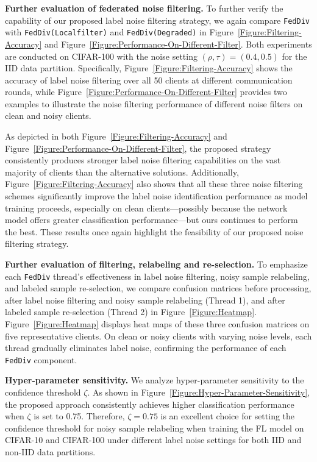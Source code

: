 \documentclass[letterpaper]{article} %
\begin{document}
\noindent
\textbf{Further evaluation of federated noise filtering.} To further verify the capability of our proposed label noise filtering strategy, we again compare \texttt{FedDiv} with \texttt{FedDiv(Local\;filter)} and \texttt{FedDiv(Degraded)} in Figure~\textcolor{red}{\ref{Figure:Filtering-Accuracy}} and Figure~\textcolor{red}{\ref{Figure:Performance-On-Different-Filter}}. Both experiments are conducted on CIFAR-100 with the noise setting $(\rho, \tau)=(0.4, 0.5)$ for the IID data partition. Specifically, Figure~\textcolor{red}{\ref{Figure:Filtering-Accuracy}} shows the accuracy of label noise filtering over all 50 clients at different communication rounds, while Figure~\textcolor{red}{\ref{Figure:Performance-On-Different-Filter}} provides two examples to illustrate the noise filtering performance of different noise filters on clean and noisy clients.

As depicted in both Figure~\textcolor{red}{\ref{Figure:Filtering-Accuracy}} and Figure~\textcolor{red}{\ref{Figure:Performance-On-Different-Filter}}, the proposed strategy consistently produces stronger label noise filtering capabilities on the vast majority of clients than the alternative solutions. Additionally, Figure~\textcolor{red}{\ref{Figure:Filtering-Accuracy}} also shows that all these three noise filtering schemes significantly improve the label noise identification performance as model training proceeds, especially on clean clients—possibly because the network model offers greater classification performance—but ours continues to perform the best.
These results once again highlight the feasibility of our proposed noise filtering strategy.

\noindent
\textbf{Further evaluation of filtering, relabeling and re-selection.} To emphasize each \texttt{FedDiv} thread's effectiveness in label noise filtering, noisy sample relabeling, and labeled sample re-selection, we compare confusion matrices before processing, after label noise filtering and noisy sample relabeling (Thread 1), and after labeled sample re-selection (Thread 2) in Figure~\textcolor{red}{\ref{Figure:Heatmap}}. Figure~\textcolor{red}{\ref{Figure:Heatmap}} displays heat maps of these three confusion matrices on five representative clients. On clean or noisy clients with varying noise levels, each thread gradually eliminates label noise, confirming the performance of each \texttt{FedDiv} component.

\noindent
\textbf{Hyper-parameter sensitivity.} 
We analyze hyper-parameter sensitivity to the confidence threshold $\zeta$. As shown in Figure~\textcolor{red}{\ref{Figure:Hyper-Parameter-Sensitivity}}, the proposed approach consistently achieves higher classification performance when $\zeta$ is set to 0.75. Therefore, $\zeta=0.75$ is an excellent choice for setting the confidence threshold for noisy sample relabeling when training the FL model on CIFAR-10 and CIFAR-100 under different label noise settings for both IID and non-IID data partitions.
\end{document}
